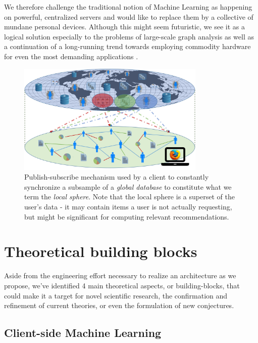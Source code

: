 \documentclass{llncs}
\begin{document}
We therefore challenge the traditional notion of Machine Learning as happening on powerful, centralized servers and would like to replace them by a collective of mundane personal devices. Although this might seem futuristic, we see it as a logical solution especially to the problems of large-scale graph analysis \cite{leskovec2006samplinggraphs} as well as a continuation of a long-running trend towards employing commodity hardware for even the most demanding applications \cite{al2008scalable}.


\begin{figure}[H]
	\begin{center}
		\includegraphics[width=0.8\textwidth]{figures/local_sphere}
		\caption{Publish-subscribe mechanism used by a client to constantly synchronize a subsample of a \textit{global database} to constitute what we term the \textit{local sphere}. Note that the local sphere is a superset of the user's data - it may contain items a user is not actually requesting, but might be significant for computing relevant recommendations.}
		\label{fig:local_sphere}
	\end{center}
\end{figure}



\section{Theoretical building blocks}
\label{sect:bg_related}

Aside from the engineering effort necessary to realize an architecture as we propose, we've identified 4 main theoretical aspects, or building-blocks, that could make it a target for novel scientific research, the confirmation and refinement of current theories, or even the formulation of new conjectures.

\subsection{Client-side Machine Learning}
\label{ssect:cs_ML}
\end{document}
